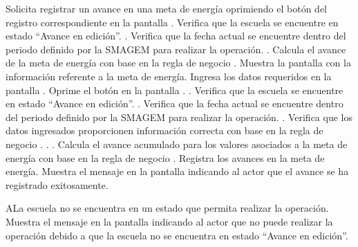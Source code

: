  \begin{UCtrayectoria}
    \UCpaso[\UCactor] Solicita registrar un avance en una meta de energía oprimiendo el botón \botMetas del registro correspondiente en la pantalla .
    \UCpaso[\UCsist] Verifica que la escuela se encuentre en estado ``Avance en edición''. .
    \UCpaso[\UCsist] Verifica que la fecha actual se encuentre dentro del periodo definido por la SMAGEM para realizar la operación. .
    \UCpaso[\UCsist] Calcula el avance de la meta de energía con base en la regla de negocio .
    \UCpaso[\UCsist] Muestra la pantalla  con la información referente a la meta de energía. 
    \UCpaso[\UCactor] Ingresa los datos requeridos en la pantalla . \label{cus24:RegAvanceEnergia}
    \UCpaso[\UCactor] Oprime el botón  en la pantalla . . 
    \UCpaso[\UCsist] Verifica que la escuela se encuentre en estado ``Avance en edición''. .
    \UCpaso[\UCsist] Verifica que la fecha actual se encuentre dentro del periodo definido por la SMAGEM para realizar la operación. .
    \UCpaso[\UCsist] Verifica que los datos ingresados proporcionen información correcta con base en la regla de negocio .  . .
    \UCpaso[\UCsist] Calcula el avance acumulado para los valores asociados a la meta de energía con base en la regla de negocio .
    \UCpaso[\UCsist] Registra los avances en la meta de energía.
    \UCpaso[\UCsist] Muestra el mensaje  en la pantalla  indicando al actor que el avance se ha registrado exitosamente.
 \end{UCtrayectoria}
 
        \begin{UCtrayectoriaA}{A}{La escuela no se encuentra en un estado que permita realizar la operación.}
	\UCpaso[\UCsist] Muestra el mensaje  en la pantalla  indicando al actor que no puede realizar la operación debido a que la escuela no se encuentra en estado ``Avance en edición''. 
    \end{UCtrayectoriaA}
 
